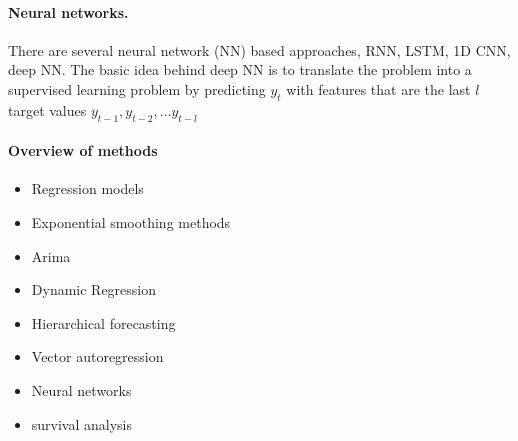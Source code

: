 \documentclass[12pt,a4paper]{article}
\begin{document}
\paragraph{Neural networks.} There are several neural network (NN) based approaches, RNN, LSTM, 1D CNN, deep NN. The basic idea behind deep NN is to translate the problem into a supervised learning problem by predicting $y_t$ with features that are the last $l$ target values $y_{t-1}, y_{t-2},\dots y_{t-l}$ 
\paragraph{Overview of methods} 
\begin{itemize}
	\item Regression models
	\item Exponential smoothing methods
	\item Arima
	\item Dynamic Regression 
	\item Hierarchical forecasting
	\item Vector autoregression
	\item Neural networks
	\item survival analysis
\end{itemize}




\end{document}
